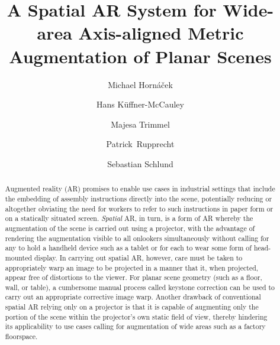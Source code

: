 \documentclass[review]{elsarticle}
\begin{document}
\begin{frontmatter}

\title{A Spatial AR System for Wide-area Axis-aligned Metric Augmentation of Planar Scenes} %

\author{Michael Horn\'{a}\v{c}ek}
\author{Hans K\"{u}ffner-McCauley}
\author{Majesa Trimmel}
\author{Patrick~Rupprecht}
\author{Sebastian Schlund}
\address{Human Centered Cyber Physical Production and Assembly Systems, Institute for Management Sciences, TU Wien, Vienna, Austria}

\begin{abstract}
Augmented reality (AR) promises to enable use cases in industrial settings that include the embedding of assembly instructions directly into the scene, potentially reducing or altogether obviating the need for workers to refer to such instructions in paper form or on a statically situated screen. \textit{Spatial} AR, in turn, is a form of AR whereby the augmentation of the scene is carried out using a projector, with the advantage of rendering the augmentation visible to all onlookers simultaneously without calling for any to hold a handheld device such as a tablet or for each to wear some form of head-mounted display. In carrying out spatial AR, however, care must be taken to appropriately warp an image to be projected in a manner that it, when projected, appear free of distortions to the viewer. For planar scene geometry (such as a floor, wall, or table), a cumbersome manual process called keystone correction can be used to carry out an appropriate corrective image warp. Another drawback of conventional spatial AR relying only on a projector is that it is capable of augmenting only the portion of the scene within the projector's own static field of view, thereby hindering its applicability to use cases calling for augmentation of wide areas such as a factory floorspace.


\end{abstract}
\end{frontmatter}
\end{document}
